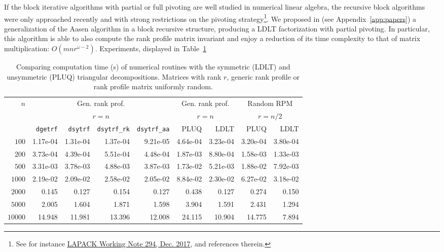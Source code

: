\documentclass{deliverablereport}
\begin{document}
If the block iterative algorithms with partial or full pivoting are well studied
in numerical linear algebra, the recursive block algorithms were only
approached recently and with strong restrictions on the pivoting
strategy\footnote{See for instance 
\href{http://www.netlib.org/lapack/lawnspdf/lawn294.pdf}{LAPACK
  Working Note 294, Dec. 2017}, and references therein.}.
We proposed in \cite{DuPe18} (see Appendix~\ref{app:papers}) a generalization of the Aasen algorithm in a block
recursive structure, producing a LDLT factorization with partial pivoting. In
particular, this algorithm is able to also compute the rank profile matrix
invariant and enjoy a reduction of its time complexity to that of matrix
multiplication: $O(mnr^{\omega-2})$. Experiments, displayed in
Table~\ref{tab:ldlt}
%
\begin{table}[htb]\centering
  \footnotesize
    \begin{tabular}{rrrrrrrrr}
  \toprule
  \multirow{3}{*}{$n$} & 
  \multicolumn{4}{c}{Gen. rank prof.} & \multicolumn{2}{c}{Gen. rank prof.} &
  \multicolumn{2}{c}{Random RPM}\\
  &\multicolumn{4}{c}{ $r=n$}&\multicolumn{2}{c}{ $r=n$}&\multicolumn{2}{c}{ $r=n/2$}\\
  & \texttt{dgetrf} & \texttt{dsytrf} & \texttt{dsytrf\_rk} & \texttt{dsytrf\_aa} & PLUQ & LDLT  & PLUQ & LDLT\\
  \midrule
$100$   & 1.17e-04 & 1.31e-04 & 1.37e-04 & 9.21e-05 & 4.64e-04 & 3.23e-04 & 3.20e-04 & 3.80e-04\\
$200$   & 3.73e-04 & 4.39e-04 & 5.51e-04 & 4.48e-04 & 1.87e-03 & 8.80e-04 & 1.58e-03 & 1.33e-03\\
$500$   & 3.31e-03 & 3.78e-03 & 4.88e-03 & 3.87e-03 & 1.73e-02 & 5.21e-03 & 1.88e-02 & 7.92e-03\\
$1000$  & 2.19e-02 & 2.09e-02 & 2.58e-02 & 2.05e-02 & 8.84e-02 & 2.30e-02 & 6.27e-02 & 3.18e-02\\
$2000$  & 0.145 & 0.127 & 0.154 & 0.127 & 0.438 & 0.127 &  0.274 & 0.150\\
$5000$  & 2.005 & 1.604 & 1.871 & 1.598 & 3.904 & 1.591 &  2.431 & 1.294\\
$10000$ & 14.948 & 11.981 & 13.396 & 12.008 & 24.115 & 10.904 & 14.775 & 7.894\\
  \bottomrule 
  \end{tabular}
  \caption{Comparing computation time (s) of numerical routines with the
    symmetric (LDLT) and unsymmetric (PLUQ) triangular decompositions. Matrices
    with rank $r$, generic rank profile or rank profile matrix uniformly
    random. }  
\label{tab:ldlt}
 \end{table}
%
\end{document}
